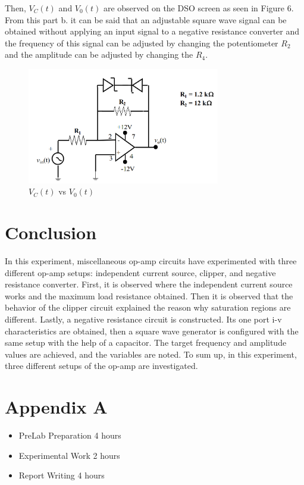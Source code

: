 \documentclass[letterpaper,12pt]{article}
\begin{document}
Then, \(V_C(t)\) and \(V_0(t)\) are observed on the DSO screen as seen in Figure 6.
From this part b. it can be said that an adjustable square wave signal can be obtained without applying an input signal to a negative resistance converter and the frequency of this signal can be adjusted by changing the potentiometer \(R_2\) and the amplitude can be adjusted by changing the \(R_4\).
\begin{figure}[H]
    \centering
    \includegraphics[width = 0.75\textwidth]{2SCH.png}
    \caption{\(V_C(t)\) vs \(V_0(t)\)}
\end{figure} 


\section{Conclusion}
In this experiment, miscellaneous op-amp circuits have experimented with three different op-amp setups: independent current source, clipper, and negative resistance converter. First, it is observed where the independent current source works and the maximum load resistance obtained. Then it is observed that the behavior of the clipper circuit explained the reason why saturation regions are different. Lastly, a negative resistance circuit is constructed. Its one port i-v characteristics are obtained, then a square wave generator is configured with the same setup with the help of a capacitor. The target frequency and amplitude values are achieved, and the variables are noted. To sum up, in this experiment, three different setups of the op-amp are investigated.
\section*{Appendix A}
\begin{itemize}
    \item PreLab Preparation 4 hours
    \item Experimental Work 2  hours
    \item Report Writing 4 hours
\end{itemize}
\end{document}
